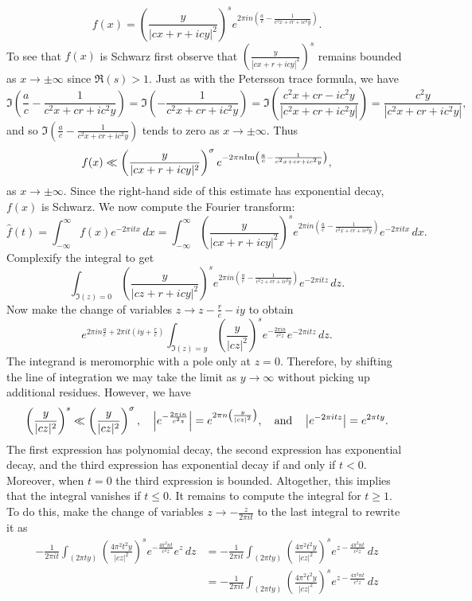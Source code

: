     \[
      f(x) = \left(\frac{y}{|cx+r+icy|^{2}}\right)^{s}e^{2\pi in\left(\frac{a}{c}-\frac{1}{c^{2}x+cr+ic^{2}y}\right)}.
    \]
    To see that $f(x)$ is Schwarz first observe that $\left(\frac{y}{|cx+r+icy|^{2}}\right)^{s}$ remains bounded as $x \to \pm \infty$ since $\Re(s) > 1$. Just as with the Petersson trace formula, we have
    \[
      \Im\left(\frac{a}{c}-\frac{1}{c^{2}x+cr+ic^{2}y}\right) = \Im\left(-\frac{1}{c^{2}x+cr+ic^{2}y}\right) = \Im\left(\frac{c^{2}x+cr-ic^{2}y}{|c^{2}x+cr+ic^{2}y|}\right) = \frac{c^{2}y}{|c^{2}x+cr+ic^{2}y|},
    \]
    and so $\Im\left(\frac{a}{c}-\frac{1}{c^{2}x+cr+ic^{2}y}\right)$ tends to zero as $x \to \pm\infty$. Thus
    \[
      f(x) \ll \left(\frac{y}{|cx+r+icy|^{2}}\right)^{\sigma}e^{-2\pi n\mathrm{Im}\left(\frac{a}{c}-\frac{1}{c^{2}x+cr+ic^{2}y}\right)},
    \]
    as $x \to \pm\infty$. Since the right-hand side of this estimate has exponential decay, $f(x)$ is Schwarz. We now compute the Fourier transform:
    \[
      \hat{f}(t) = \int_{-\infty}^{\infty}f(x)e^{-2\pi itx}\,dx = \int_{-\infty}^{\infty}\left(\frac{y}{|cx+r+icy|^{2}}\right)^{s}e^{2\pi in\left(\frac{a}{c}-\frac{1}{c^{2}x+cr+ic^{2}y}\right)}e^{-2\pi itx}\,dx.
    \]
    Complexify the integral to get
    \[
      \int_{\Im(z) = 0}\left(\frac{y}{|cz+r+icy|^{2}}\right)^{s}e^{2\pi in\left(\frac{a}{c}-\frac{1}{c^{2}z+cr+ic^{2}y}\right)}e^{-2\pi itz}\,dz.
    \]
    Now make the change of variables $z \to z-\frac{r}{c}-iy$ to obtain
    \[
      e^{2\pi in\frac{a}{c}+2\pi it\left(iy+\frac{r}{c}\right)}\int_{\Im(z) = y}\left(\frac{y}{|cz|^{2}}\right)^{s}e^{-\frac{2\pi in}{c^{2}z}}e^{-2\pi itz}\,dz.
    \]
    The integrand is meromorphic with a pole only at $z = 0$. Therefore, by shifting the line of integration we may take the limit as $y \to \infty$ without picking up additional residues. However, we have
    \[
      \left(\frac{y}{|cz|^{2}}\right)^{s} \ll \left(\frac{y}{|cz|^{2}}\right)^{\sigma}, \quad \left|e^{-\frac{2\pi in}{c^{2}z}}\right| = e^{2\pi n\left(\frac{y}{|cz|^{2}}\right)}, \quad \text{and} \quad \left|e^{-2\pi itz}\right| = e^{2\pi ty}.
    \]
    The first expression has polynomial decay, the second expression has exponential decay, and the third expression has exponential decay if and only if $t < 0$. Moreover, when $t = 0$ the third expression is bounded. Altogether, this implies that the integral vanishes if $t \le 0$. It remains to compute the integral for $t \ge 1$. To do this, make the change of variables $z \to - \frac{z}{2\pi it}$ to the last integral to rewrite it as
    \begin{align*}
      -\frac{1}{2\pi it}\int_{(2\pi ty)}\left(\frac{4\pi^{2}t^{2}y}{|cz|^{2}}\right)^{s}e^{-\frac{4\pi^{2}nt}{c^{2}z}}e^{z}\,dz &= -\frac{1}{2\pi it}\int_{(2\pi ty)}\left(\frac{4\pi^{2}t^{2}y}{|cz|^{2}}\right)^{s}e^{z-\frac{4\pi^{2}nt}{c^{2}z}}\,dz \\
      &= -\frac{1}{2\pi it}\int_{(2\pi ty)}\left(\frac{4\pi^{2}t^{2}y}{|cz|^{2}}\right)^{s}e^{z-\frac{4\pi^{2}nt}{c^{2}z}}\,dz \\
    \end{align*}
